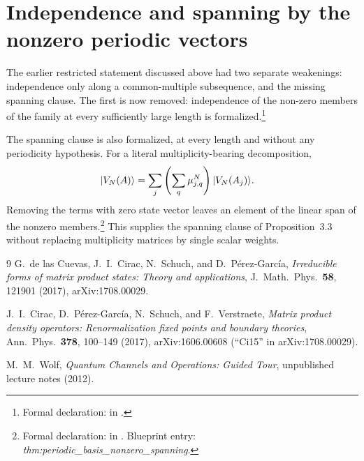 \documentclass{article}
\begin{document}
\section{Independence and spanning by the nonzero periodic vectors}

The earlier restricted statement discussed above had two separate weakenings:
independence only along a common-multiple subsequence, and the missing spanning
clause. The
first is now removed: independence of the non-zero members of the family at
every sufficiently large length is
formalized.\footnote{Formal declaration:
in .}

The spanning clause is also formalized, at every length and without any
periodicity hypothesis. For a literal multiplicity-bearing decomposition,
\begin{align}
    |V_N(A)\rangle
    &=\sum_j\left(\sum_q\mu_{j,q}^{N}\right)|V_N(A_j)\rangle.
    \label{eq:dccsp17_nonzero_spanning}
\end{align}
Removing the terms with zero state vector leaves an element of the linear
span of the nonzero members.\footnote{Formal declaration:
in . Blueprint entry:
\emph{thm:periodic\_basis\_nonzero\_spanning}.} This supplies the spanning
clause of Proposition~3.3 without replacing multiplicity matrices by single
scalar weights.


\begin{thebibliography}{9}
G.~de las Cuevas, J.~I.~Cirac, N.~Schuch, and D.~P\'erez-Garc\'ia,
\emph{Irreducible forms of matrix product states: Theory and applications},
J.~Math.~Phys.\ \textbf{58}, 121901 (2017), arXiv:1708.00029.

J.~I.~Cirac, D.~P\'erez-Garc\'ia, N.~Schuch, and F.~Verstraete,
\emph{Matrix product density operators: Renormalization fixed points and
boundary theories}, Ann.\ Phys.\ \textbf{378}, 100--149 (2017),
arXiv:1606.00608 (``Ci15'' in arXiv:1708.00029).

M.~M.~Wolf, \emph{Quantum Channels and Operations: Guided Tour}, unpublished
lecture notes (2012).
\end{thebibliography}
\end{document}
